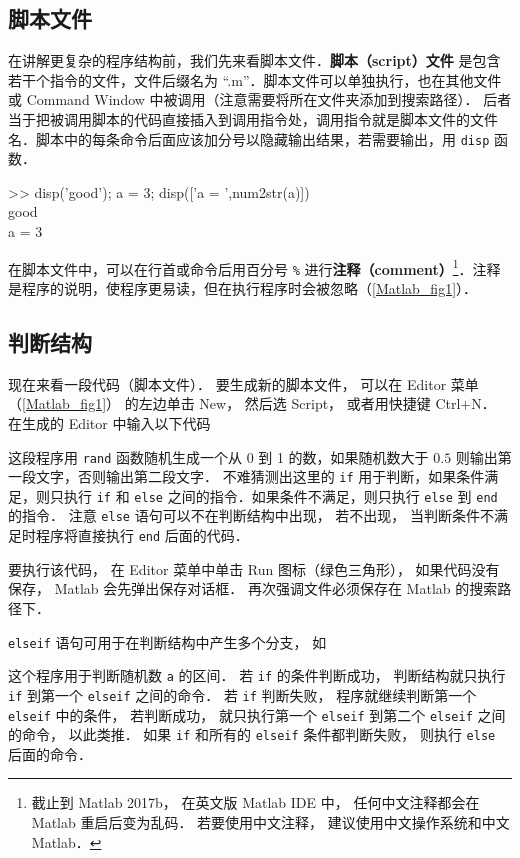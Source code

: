 

\subsection{脚本文件}
在讲解更复杂的程序结构前，我们先来看脚本文件．\textbf{脚本（script）文件} 是包含若干个指令的文件，文件后缀名为 “.m”．脚本文件可以单独执行，也在其他文件或 Command Window 中被调用（注意需要将所在文件夹添加到搜索路径）． 后者当于把被调用脚本的代码直接插入到调用指令处，调用指令就是脚本文件的文件名．脚本中的每条命令后面应该加分号以隐藏输出结果，若需要输出，用 \texttt{disp} 函数．
\begin{Command}
>> disp('good'); a = 3; disp(['a = ',num2str(a)]) \\
good \\
a = 3
\end{Command}
在脚本文件中，可以在行首或命令后用百分号 \texttt{\%} 进行\textbf{注释（comment）}\footnote{截止到 Matlab 2017b， 在英文版 Matlab IDE 中， 任何中文注释都会在 Matlab 重启后变为乱码． 若要使用中文注释， 建议使用中文操作系统和中文 Matlab．}．注释是程序的说明，使程序更易读，但在执行程序时会被忽略（\autoref{Matlab_fig1}）．

\subsection{判断结构}
现在来看一段代码（脚本文件）． 要生成新的脚本文件， 可以在 Editor 菜单（\autoref{Matlab_fig1}） 的左边单击 New， 然后选 Script， 或者用快捷键 Ctrl+N． 在生成的 Editor 中输入以下代码

这段程序用 \texttt{rand} 函数随机生成一个从 0 到 1 的数，如果随机数大于 $0.5$ 则输出第一段文字，否则输出第二段文字． 不难猜测出这里的 \texttt{if} 用于判断，如果条件满足，则只执行 \texttt{if} 和 \texttt{else} 之间的指令．如果条件不满足，则只执行 \texttt{else} 到 \texttt{end} 的指令． 注意 \texttt{else} 语句可以不在判断结构中出现， 若不出现， 当判断条件不满足时程序将直接执行 \texttt{end} 后面的代码．

要执行该代码， 在 Editor 菜单中单击 Run 图标（绿色三角形）， 如果代码没有保存， Matlab 会先弹出保存对话框． 再次强调文件必须保存在 Matlab 的搜索路径下．

\texttt{elseif} 语句可用于在判断结构中产生多个分支， 如

这个程序用于判断随机数 \texttt{a} 的区间． 若 \texttt{if} 的条件判断成功， 判断结构就只执行 \texttt{if} 到第一个 \texttt{elseif} 之间的命令． 若 \texttt{if} 判断失败， 程序就继续判断第一个 \texttt{elseif} 中的条件， 若判断成功， 就只执行第一个 \texttt{elseif} 到第二个 \texttt{elseif} 之间的命令， 以此类推． 如果 \texttt{if} 和所有的 \texttt{elseif} 条件都判断失败， 则执行 \texttt{else} 后面的命令．

